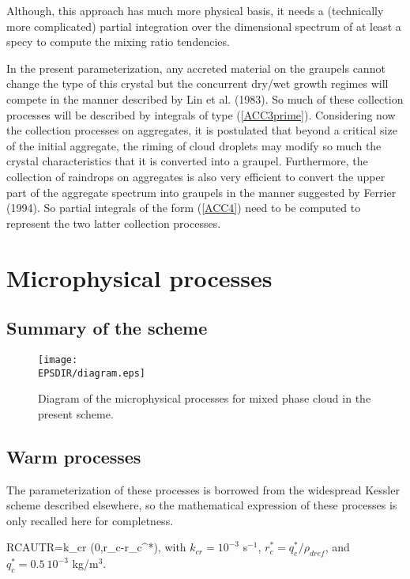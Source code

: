 Although, this approach has much more physical basis, it needs a (technically
more complicated) partial integration over the dimensional spectrum of at least
a specy to compute the mixing ratio tendencies.

In the present parameterization, any accreted material on the graupels cannot
change the type of this crystal but the concurrent dry/wet growth regimes will
compete in the manner described by Lin et al. (1983). So much of these
collection processes will be described by integrals of type (\ref{ACC3prime}).
Considering now the collection processes on aggregates, it is postulated that
beyond a critical size of the initial aggregate, the riming of cloud droplets
may modify so much the crystal characteristics that it is converted into a
graupel. Furthermore, the collection of raindrops on aggregates is also very
efficient to convert the upper part of the aggregate spectrum into graupels in
the manner suggested by Ferrier (1994). So partial integrals of the form
(\ref{ACC4}) need to be computed to represent the two latter collection processes.

\newpage
%
\section{Microphysical processes}
%
%
\subsection{Summary of the scheme}
%
\begin{figure}[!ht]
\centerline{\texttt{[image: \\EPSDIR/diagram.eps]}}
\caption{Diagram of the microphysical processes for mixed phase cloud in the present scheme.}
\label{mixfigdiagram}
\end{figure}

%
\subsection{Warm processes}
%
The parameterization of these processes is borrowed from the widespread Kessler
scheme described elsewhere, so the mathematical expression of these processes is
only recalled here for completness.

%
\be\label{WARM1}
RCAUTR=k_{cr} \max(0,r_c-r_c^*),
\ee
%
\noindent with $k_{cr}=10^{-3}$ s$^{-1}$,
$r_c^*=q_c^*/\rho_{dref}$, and $q_c^*=0.5\ 10^{-3}$ kg/m$^3$.

